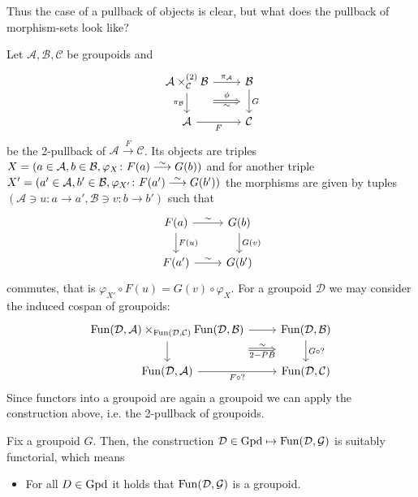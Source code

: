 Thus the case of a pullback of objects is clear, but what does the pullback of morphism-sets look like?

\begin{construction}
\label{2-pullback_functor_categories}
	Let $ \mathcal{ A } , \mathcal{ B } , \mathcal{ C } $ be groupoids
	and 
	\[
	\begin{tikzcd}
		\mathcal{ A } \times_{ \mathcal{ C } }^{ ( 2 ) } \mathcal{ B }
		\ar[r, " { \pi_{ \mathcal{ A } } } " ]
		\ar[d, " { \pi_{ \mathcal{ B } } } "' ]
		\ar[r, Rightarrow, shift right=7, " \sim "', " \phi " ]
		&
		\mathcal{ B }
		\ar[d ," G " ]
		\\
		\mathcal{ A }
		\ar[r , " F "' ]
		&
		\mathcal{ C }
	\end{tikzcd}
	\] 
	be the 2-pullback of $ \mathcal{ A } \xrightarrow{ F } \mathcal{ C } $.
	Its objects are triples $ X = ( a \in \mathcal{ A } , b \in \mathcal{ B } , \varphi_X \colon F ( a ) \isomorphism G ( b ) ) $ and for another triple $ X' = ( a' \in \mathcal{ A } , b' \in \mathcal{ B } , \varphi_{ X' } \colon F ( a' ) \isomorphism G ( b' ) ) $ the morphisms are given by tuples $  ( \mathcal{ A } \ni u \colon a \to a' , \mathcal{ B } \ni v \colon b \to b' ) $ such that 
	\[
	\begin{tikzcd}
		F ( a )
		\ar[r, " \sim "]
		\ar[d, " F ( u )"]
		&
		G ( b ) 
		\ar[ d , " G ( v ) "]
		\\
		F ( a ' )
		\ar[ r, " \sim "]
		&
		G ( b ' ) 
	\end{tikzcd}
	\] 
	commutes, that is $ \varphi_{X'} \circ F ( u ) = G ( v ) \circ \varphi_X.$
	For a groupoid $ \mathcal{ D } $ we may consider the induced cospan of groupoids:
	\[
		\begin{tikzcd}
			\Fun ( \mathcal{ D } , \mathcal{ A } ) \times_{ \Fun ( \mathcal{ D } , \mathcal{ C } )  } \Fun ( \mathcal{ D } , \mathcal{B } )
			\ar[d]
			\ar[r]
			\ar[r, Rightarrow, shift right=7, "\sim", "2-PB"']
			&
			\Fun( \mathcal{ D } , \mathcal{ B } )
			\ar[d, " G \circ ? "]
			\\
			\Fun ( \mathcal{ D } , \mathcal{ A } )
			\ar[r, " F  \circ ? "']
			&
			\Fun( \mathcal{ D } , \mathcal{ C }) 
		\end{tikzcd}
	\]
	Since functors into a groupoid are again a groupoid we can apply the construction above, i.e. the 2-pullback of groupoids.
	
	\begin{Interlude}
		Fix a groupoid $ G $.  
		Then, the construction $ \mathcal{ D } \in \operatorname{Gpd} \mapsto \operatorname{Fun} ( \mathcal{ D } , \mathcal{ G } )$ is suitably functorial, which means 
		\begin{itemize}
			\item 
			For all $ D \in \operatorname{Gpd} $ it holds that $ \operatorname{Fun} ( \mathcal{ D } , \mathcal{ G } ) $ is a groupoid.
			

\end{itemize}
\end{Interlude}
\end{construction}

